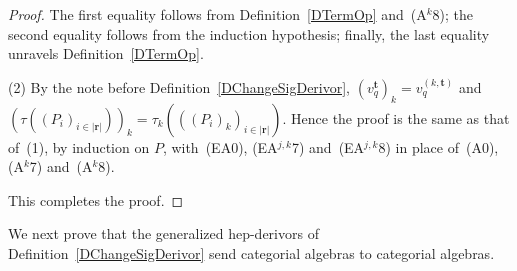 \documentclass[a4paper, reqno
]{amsart}
\newcommand{\bb}[1]{\ensuremath{\lvert #1 \rvert}}
\theoremstyle{plain}
\theoremstyle{definition}
\begin{document}
\begin{proof}
The first equality follows from Definition~\ref{DTermOp} and~(A$^{k}$8); the second equality follows from the induction hypothesis; finally, the last equality unravels Definition~\ref{DTermOp}.

(2) By the note before Definition~\ref{DChangeSigDerivor}, $(v^{\mathbf{t}}_{q})_{k}=v^{(k,\mathbf{t})}_{q}$ and $(\tau((P_{i})_{i\in\bb{\mathbf{r}}}))_{k}=\tau_{k}(((P_{i})_{k})_{i\in\bb{\mathbf{r}}})$.
Hence the proof is the same as that of~(1), by induction on $P$, with~(EA0), (EA$^{j,k}$7) and~(EA$^{j,k}$8) in place of~(A0), (A$^{k}$7) and~(A$^{k}$8).

This completes the proof.
\end{proof}

We next prove that the generalized hep-derivors of Definition~\ref{DChangeSigDerivor} send categorial algebras to categorial algebras.
\end{document}
